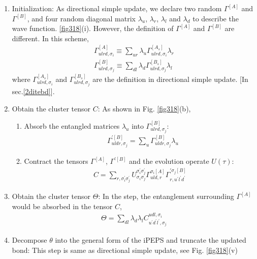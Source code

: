 \begin{enumerate}
	\item Initialization: As directional simple update, we declare two random $\Gamma^{[A]}$ and $\Gamma^{[B]}$, and four random diagonal matrix $\lambda_{u}$, $\lambda_{r}$, $\lambda_{l}$ and $\lambda_{d}$ to describe the wave function. \ref{fig318}(i). However, the definition of $\Gamma^{[A]}$ and $\Gamma^{[B]}$ are different. In this scheme,
		\begin{align}
			\Gamma^{[A]}_{ulrd,\sigma_i} \equiv \sum_{ur}{\lambda_{u} \Gamma^{[A_s]}_{ulrd,\sigma_i} \lambda_{r}} \\
			\Gamma^{[B]}_{ulrd,\sigma_j} \equiv \sum_{dl}{\lambda_{d} \Gamma^{[B_s]}_{ulrd,\sigma_j} \lambda_{l}}
		\end{align}
		where $\Gamma^{[A_s]}_{ulrd,\sigma_i}$ and $\Gamma^{[B_s]}_{ulrd,\sigma_j}$ are the definition in directional simple update. [In sec.\ref{2ditebd}].
	\item Obtain the cluster tensor $C$: As shown in Fig. \ref{fig318}(b),
			\begin{enumerate}
				\item Absorb the entangled matrices $\lambda_{u}$ into  $\Gamma^{[B]}_{ulrd,\sigma_j}$:
					\begin{align}
						&\Gamma^{\prime [B]}_{uldr, \sigma_j} = \sum_{u}{\Gamma^{[B]}_{uldr,\sigma_j} \lambda_{u}}
					\end{align}
				\item Contract the tensors $\Gamma^{[A]}$, $\Gamma^{\prime [B]}$ and the evolution operate $U(\tau)$: 
					\begin{align}
						C = \sum_{r,\sigma_i^{\prime}\sigma_j^{\prime}}{U^{\sigma_i^{\prime}\sigma_j^{\prime}}_{\sigma_i\sigma_j} \Gamma^{\sigma_i [A]}_{uld,r} \Gamma^{\prime \sigma_j[B]}_{r,u^{\prime} l^{\prime} d^{\prime}}}
					\end{align}
			\end{enumerate}
		\item Obtain the cluster tensor $\Theta$: In the step, the entanglement surrounding $\Gamma^{[A]}$ would be absorbed in the tensor $C$,
			\begin{align}
				\Theta = \sum_{dl}{\lambda_{d} \lambda_{l} C^{udl,\sigma_i}_{u^{\prime}d^{\prime}l^{\prime},\sigma_j}}
			\end{align}
		\item Decompose $\theta$ into the general form of the iPEPS and truncate the updated bond: This step is same as directional simple update, see Fig. \ref{fig318}(v)

\end{enumerate}
